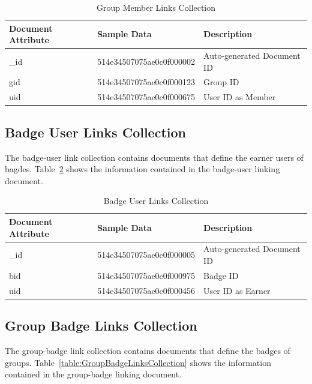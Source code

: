\begin{table}[H]
\caption{Group Member Links Collection}\label{table:GroupMemberLinksCollection}
\textbf{ }
\begin{center}
\begin{tabular}{ | l | l |  l | }
\hline
Document Attribute & Sample Data & Description \\ \hline
{\_}id & 514e34507075ae0c0f000002 & Auto-generated Document ID \\ \hline
gid & 514e34507075ae0c0f000123 & Group ID   \\ \hline
uid & 514e34507075ae0c0f000675 & User ID as Member   \\ \hline
\end{tabular}
\end{center}
\end{table}


\subsection{Badge User Links Collection}
The badge-user link collection contains documents that define the earner users of bagdes. Table~\ref{table:BadgeUserLinksCollection} shows the information contained in the badge-user linking document.

\begin{table}[H]
\caption{Badge User Links Collection}\label{table:BadgeUserLinksCollection}
\textbf{ }
\begin{center}
\begin{tabular}{ | l | l |  l | }
\hline
Document Attribute & Sample Data & Description \\ \hline
{\_}id & 514e34507075ae0c0f000005 & Auto-generated Document ID \\ \hline
bid & 514e34507075ae0c0f000975 & Badge ID   \\ \hline
uid & 514e34507075ae0c0f000456 & User ID as Earner   \\ \hline
\end{tabular}
\end{center}
\end{table}


\subsection{Group Badge Links Collection}
The group-badge link collection contains documents that define the badges of groups. Table~\ref{table:GroupBadgeLinksCollection} shows the information contained in the group-badge linking document.

